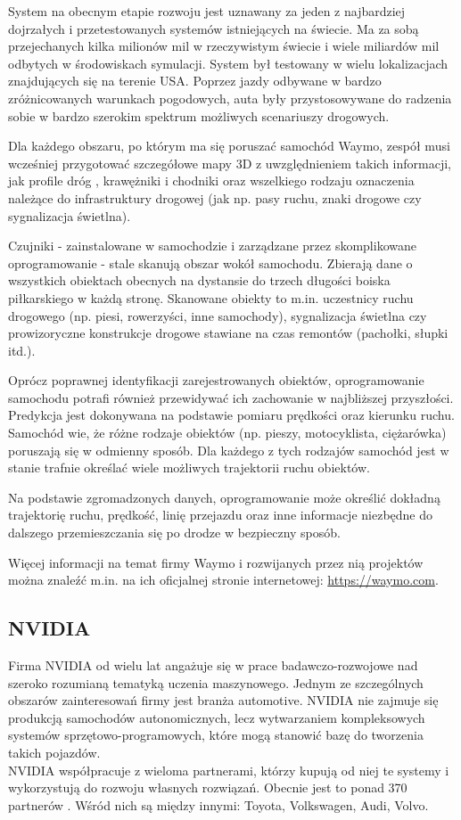 System na obecnym etapie rozwoju jest uznawany za jeden z najbardziej dojrzałych i przetestowanych systemów istniejących na świecie. Ma za sobą przejechanych kilka milionów mil w rzeczywistym świecie i wiele miliardów mil odbytych w środowiskach symulacji. System był testowany w wielu lokalizacjach znajdujących się na terenie USA. Poprzez jazdy odbywane w bardzo zróżnicowanych warunkach pogodowych, auta były przystosowywane do radzenia sobie w bardzo szerokim spektrum możliwych scenariuszy drogowych.

Dla każdego obszaru, po którym ma się poruszać samochód Waymo, zespół musi wcześniej przygotować szczegółowe mapy 3D z uwzględnieniem takich informacji, jak profile dróg \cite{wikipedia:designOfRoads}, krawężniki i chodniki oraz wszelkiego rodzaju oznaczenia należące do infrastruktury drogowej (jak np. pasy ruchu, znaki drogowe czy sygnalizacja świetlna).

Czujniki - zainstalowane w samochodzie i zarządzane przez skomplikowane oprogramowanie - stale skanują obszar wokół samochodu. Zbierają dane o wszystkich obiektach obecnych na dystansie do trzech długości boiska piłkarskiego w każdą stronę. Skanowane obiekty to m.in. uczestnicy ruchu drogowego (np. piesi, rowerzyści, inne samochody), sygnalizacja świetlna czy prowizoryczne konstrukcje drogowe stawiane na czas remontów (pachołki, słupki itd.).

Oprócz poprawnej identyfikacji zarejestrowanych obiektów, oprogramowanie samochodu potrafi również przewidywać ich zachowanie w najbliższej przyszłości. Predykcja jest dokonywana na podstawie pomiaru prędkości oraz kierunku ruchu.
Samochód wie, że różne rodzaje obiektów (np. pieszy, motocyklista, ciężarówka) poruszają się w odmienny sposób. Dla każdego z tych rodzajów samochód jest w stanie trafnie określać wiele możliwych trajektorii ruchu obiektów.

Na podstawie zgromadzonych danych, oprogramowanie może określić dokładną trajektorię ruchu, prędkość, linię przejazdu oraz inne informacje niezbędne do dalszego przemieszczania się po drodze w bezpieczny sposób.

Więcej informacji na temat firmy Waymo i rozwijanych przez nią projektów można znaleźć m.in. na ich oficjalnej stronie internetowej: \url{https://waymo.com}.

\subsection{NVIDIA}
Firma NVIDIA od wielu lat angażuje się w prace badawczo-rozwojowe nad szeroko rozumianą tematyką uczenia maszynowego. Jednym ze szczególnych obszarów zainteresowań firmy jest branża automotive.
NVIDIA nie zajmuje się produkcją samochodów autonomicznych, lecz wytwarzaniem kompleksowych systemów sprzętowo-programowych, które mogą stanowić bazę do tworzenia takich pojazdów. \\
NVIDIA współpracuje z wieloma partnerami, którzy kupują od niej te systemy i wykorzystują do rozwoju własnych rozwiązań. Obecnie jest to ponad 370 partnerów \cite{nvidia:partners}. Wśród nich są między innymi: Toyota, Volkswagen, Audi, Volvo.


